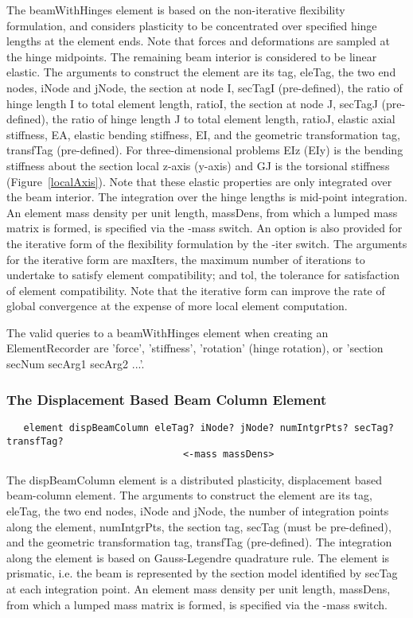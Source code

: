 \documentclass[12pt]{article}
\begin{document}
\noindent The beamWithHinges element is based on the non-iterative flexibility
formulation, and considers plasticity to be concentrated over
specified hinge lengths at the element ends. Note that forces and deformations
are sampled at the hinge midpoints. The remaining beam
interior is considered to be linear elastic. The arguments to
construct the element are its tag, eleTag, the two end nodes, iNode
and jNode, the section at node I, secTagI (pre-defined), the ratio of
hinge length I to total element length, ratioI, the section at node J,
secTagJ (pre-defined), the ratio of hinge length J to total element
length, ratioJ, elastic axial stiffness, EA, elastic bending
stiffness, EI, and the geometric transformation tag, transfTag
(pre-defined). For three-dimensional problems EIz (EIy) is the bending
stiffness about the section local z-axis (y-axis) and GJ is the
torsional stiffness (Figure~\ref{localAxis}). Note that these elastic
properties are only integrated over the beam interior. The integration
over the hinge lengths is mid-point integration. An element mass
density per unit length, massDens, from which a lumped mass matrix 
is formed, is specified via the -mass switch. An option is also
provided for the iterative form of the flexibility formulation by the
-iter switch. The arguments for the iterative form are maxIters, the
maximum number of iterations to undertake to satisfy element
compatibility; and tol, the tolerance for satisfaction of element
compatibility. Note that the iterative form can improve the rate of
global convergence at the expense of more local element computation. 

The valid queries to a beamWithHinges element when creating an
ElementRecorder are 'force', 'stiffness', 'rotation' (hinge rotation),
or 'section secNum secArg1 secArg2 ...'. 

\subsubsection{The Displacement Based Beam Column Element}
{\sf\small
\begin{verbatim}
   element dispBeamColumn eleTag? iNode? jNode? numIntgrPts? secTag? transfTag?
                               <-mass massDens>
\end{verbatim}
}

\noindent The dispBeamColumn element is a distributed plasticity, displacement
based beam-column element. The arguments to construct the element
are its tag, eleTag, the two end nodes, iNode and jNode, the number of
integration points along the element, numIntgrPts, the section tag,
secTag (must be pre-defined), and the geometric transformation tag,
transfTag (pre-defined). The integration along the element is based on
Gauss-Legendre quadrature rule. The element is prismatic, i.e. the beam is
represented by the
section  model identified by secTag at each integration point. An
element mass density per unit length, massDens, from which a lumped
mass matrix is formed, is specified via the -mass switch.
\end{document}

